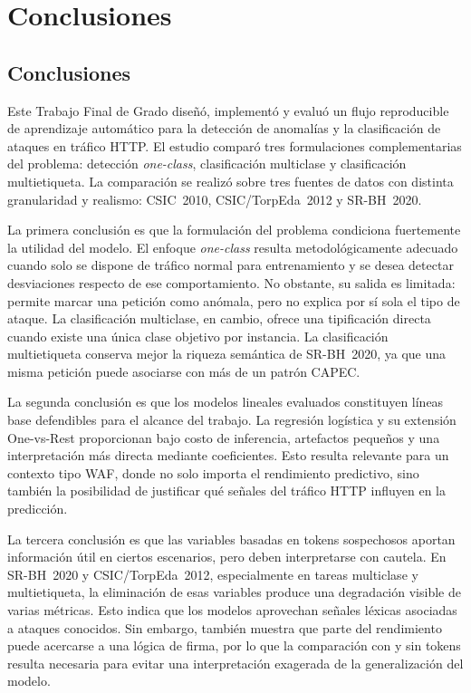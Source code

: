 \documentclass[12pt,oneside]{report}
\begin{document}
\chapter{Conclusiones}

\section{Conclusiones}

Este Trabajo Final de Grado diseñó, implementó y evaluó un flujo reproducible de aprendizaje automático para la detección de anomalías y la clasificación de ataques en tráfico HTTP. El estudio comparó tres formulaciones complementarias del problema: detección \textit{one-class}, clasificación multiclase y clasificación multietiqueta. La comparación se realizó sobre tres fuentes de datos con distinta granularidad y realismo: CSIC~2010, CSIC/TorpEda~2012 y SR-BH~2020.

La primera conclusión es que la formulación del problema condiciona fuertemente la utilidad del modelo. El enfoque \textit{one-class} resulta metodológicamente adecuado cuando solo se dispone de tráfico normal para entrenamiento y se desea detectar desviaciones respecto de ese comportamiento. No obstante, su salida es limitada: permite marcar una petición como anómala, pero no explica por sí sola el tipo de ataque. La clasificación multiclase, en cambio, ofrece una tipificación directa cuando existe una única clase objetivo por instancia. La clasificación multietiqueta conserva mejor la riqueza semántica de SR-BH~2020, ya que una misma petición puede asociarse con más de un patrón CAPEC.

La segunda conclusión es que los modelos lineales evaluados constituyen líneas base defendibles para el alcance del trabajo. La regresión logística y su extensión One-vs-Rest proporcionan bajo costo de inferencia, artefactos pequeños y una interpretación más directa mediante coeficientes. Esto resulta relevante para un contexto tipo WAF, donde no solo importa el rendimiento predictivo, sino también la posibilidad de justificar qué señales del tráfico HTTP influyen en la predicción.

La tercera conclusión es que las variables basadas en tokens sospechosos aportan información útil en ciertos escenarios, pero deben interpretarse con cautela. En SR-BH~2020 y CSIC/TorpEda~2012, especialmente en tareas multiclase y multietiqueta, la eliminación de esas variables produce una degradación visible de varias métricas. Esto indica que los modelos aprovechan señales léxicas asociadas a ataques conocidos. Sin embargo, también muestra que parte del rendimiento puede acercarse a una lógica de firma, por lo que la comparación con y sin tokens resulta necesaria para evitar una interpretación exagerada de la generalización del modelo.
\end{document}
